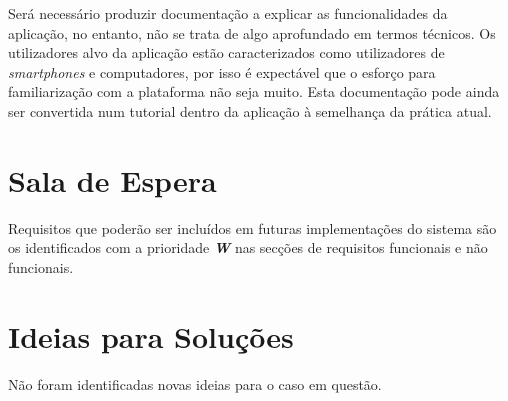 Será necessário produzir documentação a explicar as funcionalidades da aplicação, no entanto, não se trata de algo aprofundado em termos técnicos. Os utilizadores alvo da aplicação estão caracterizados como utilizadores de \emph{smartphones} e computadores, por isso é expectável que o esforço para familiarização com a plataforma não seja muito. Esta documentação pode ainda ser convertida num tutorial dentro da aplicação à semelhança da prática atual.

\section{Sala de Espera}

Requisitos que poderão ser incluídos em futuras implementações do sistema são os identificados com a prioridade \emph{\bf{W}} nas secções de requisitos funcionais e não funcionais.

\section{Ideias para Soluções}

Não foram identificadas novas ideias para o caso em questão.